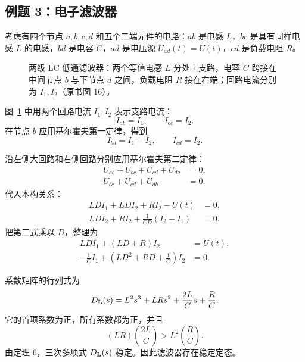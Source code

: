 \subsection*{例题 3：电子滤波器}

考虑有四个节点 \(a,b,c,d\) 和五个二端元件的电路：\(ab\) 是电感 \(L\)，\(bc\) 是具有同样电感 \(L\) 的电感，\(bd\) 是电容 \(C\)，\(ad\) 是电压源 \(U_{ad}(t)=U(t)\)，\(cd\) 是负载电阻 \(R\)。

\begin{figure}[H]
 \centering
 \resizebox{0.72\textwidth}{!}{}
 \caption{两级 LC 低通滤波器：两个等值电感 \(L\) 分处上支路，电容 \(C\) 跨接在中间节点 \(b\) 与下节点 \(d\) 之间，负载电阻 \(R\) 接在右端；回路电流分别为 \(I_1,I_2\)（原书图 16）。}
 \label{fig:ch2-13-filter}
\end{figure}

图~\ref{fig:ch2-13-filter} 中用两个回路电流 \(I_1,I_2\) 表示支路电流：
\begin{equation}
 I_{ab}=I_1,
 \qquad
 I_{bc}=I_2.
 \label{eq:ch2-13-filter-loop-currents}
\end{equation}
在节点 \(b\) 应用基尔霍夫第一定律，得到
\begin{equation}
 I_{bd}=I_1-I_2,
 \qquad
 I_{cd}=I_2.
 \label{eq:ch2-13-filter-branch-currents}
\end{equation}

沿左侧大回路和右侧回路分别应用基尔霍夫第二定律：
\begin{align}
 U_{ab}+U_{bc}+U_{cd}+U_{da}&=0,
 \label{eq:ch2-13-filter-kvl1}\\
 U_{bc}+U_{cd}+U_{db}&=0.
 \label{eq:ch2-13-filter-kvl2}
\end{align}
代入本构关系：
\begin{align}
 LDI_1+LDI_2+RI_2-U(t)&=0,
 \label{eq:ch2-13-filter-equations1}\\
 LDI_2+RI_2+\frac1{CD}(I_2-I_1)&=0.
 \label{eq:ch2-13-filter-equations2}
\end{align}
把第二式乘以 \(D\)，整理为
\begin{align}
 LDI_1+(LD+R)I_2&=U(t),
 \label{eq:ch2-13-filter-system1}\\
 -\frac1C I_1+\left(LD^2+RD+\frac1C\right)I_2&=0.
 \label{eq:ch2-13-filter-system2}
\end{align}

系数矩阵的行列式为
\begin{equation}
 D_{\mathbf{L}}(s)
 =L^2s^3+LRs^2+\frac{2L}{C}s+\frac{R}{C}.
 \label{eq:ch2-13-filter-determinant}
\end{equation}
它的首项系数为正，所有系数都为正，并且
\[
 (LR)\left(\frac{2L}{C}\right)
 > L^2\left(\frac{R}{C}\right).
\]
由定理 6，三次多项式 \(D_{\mathbf{L}}(s)\) 稳定。因此滤波器存在稳定定态。

